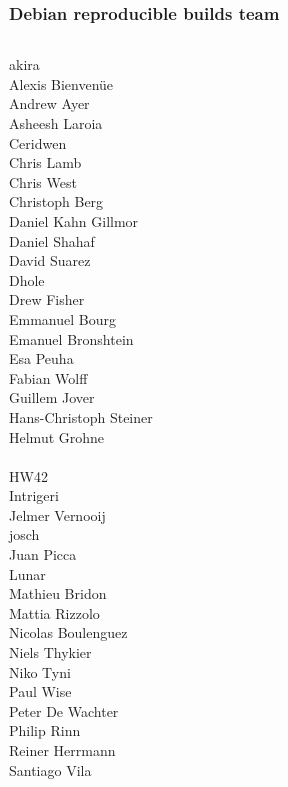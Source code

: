 \documentclass[14pt]{beamer}
\begin{document}
\begin{frame}
 \frametitle{Debian reproducible builds team}
 \begin{center}
  \begin{columns}
   \footnotesize
    {akira} \\
    {Alexis Bienvenüe} \\
    {Andrew Ayer} \\
    {Asheesh Laroia} \\
    {Ceridwen} \\
    {Chris Lamb} \\
    {Chris West} \\
    {Christoph Berg} \\
    {Daniel Kahn Gillmor} \\
    {Daniel Shahaf} \\
    David Suarez \\
    {Dhole} \\
    Drew Fisher \\
    Emmanuel Bourg \\
    Emanuel Bronshtein \\
    Esa Peuha \\
    {Fabian Wolff} \\
    {Guillem Jover} \\
    Hans-Christoph Steiner \\
    {Helmut Grohne} \\
     \\
    HW42 \\
    Intrigeri \\
    {Jelmer Vernooij} \\
    {josch} \\
    Juan Picca \\
    {Lunar} \\
    Mathieu Bridon \\
    {Mattia Rizzolo} \\
    Nicolas Boulenguez \\
    {Niels Thykier} \\
    Niko Tyni \\
    {Paul Wise} \\
    Peter De Wachter \\
    Philip Rinn \\
    {Reiner Herrmann} \\
    {Santiago Vila} \\

\end{columns}
\end{center}
\end{frame}
\end{document}
